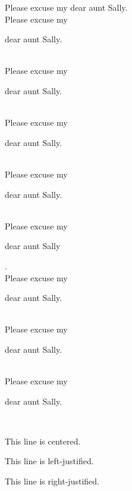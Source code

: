 \documentclass[12pt, a4paper]{article}
\begin{document}
Please excuse my dear aunt Sally. \\
Please excuse my \begin{large}dear aunt Sally.\end{large} \\
Please excuse my \begin{Large}dear aunt Sally.\end{Large} \\
Please excuse my \begin{huge}dear aunt Sally.\end{huge} \\
Please excuse my \begin{Huge}dear aunt Sally.\end{Huge} \\
Please excuse my \begin{normalsize} dear aunt Sally\end{normalsize}. \\ 

Please excuse my \begin{small}dear aunt Sally.\end{small} \\
Please excuse my \begin{scriptsize}dear aunt Sally.\end{scriptsize} \\
Please excuse my \begin{tiny}dear aunt Sally.\end{tiny} \\

\vspace{1cm}

\begin{center}
    This line is centered.
\end{center}

\begin{flushleft}
    This line is left-justified.
\end{flushleft}

\begin{flushright}
    This line is right-justified.
\end{flushright}
\end{document}
